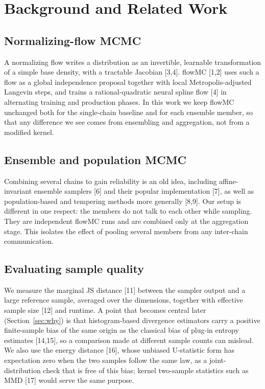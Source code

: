 \documentclass[11pt]{article}
\begin{document}
\section{Background and Related Work}

\subsection{Normalizing-flow MCMC}
A normalizing flow writes a distribution as an invertible, learnable
transformation of a simple base density, with a tractable Jacobian [3,4].
flowMC [1,2] uses such a flow as a global independence proposal together with
local Metropolis-adjusted Langevin steps, and trains a rational-quadratic
neural spline flow [4] in alternating training and production phases. In this
work we keep flowMC unchanged both for the single-chain baseline and for each
ensemble member, so that any difference we see comes from ensembling and
aggregation, not from a modified kernel.

\subsection{Ensemble and population MCMC}
Combining several chains to gain reliability is an old idea, including
affine-invariant ensemble samplers [6] and their popular implementation [7],
as well as population-based and tempering methods more generally [8,9]. Our
setup is different in one respect: the members do not talk to each other while
sampling. They are independent flowMC runs and are combined only at the
aggregation stage. This isolates the effect of pooling several members from
any inter-chain communication.

\subsection{Evaluating sample quality}
We measure the marginal JS distance [11] between the sampler output and a
large reference sample, averaged over the dimensions, together with effective
sample size [12] and runtime. A point that becomes central later
(Section~\ref{sec:why}) is that histogram-based divergence estimators carry a
positive finite-sample bias of the same origin as the classical bias of
plug-in entropy estimates [14,15], so a comparison made at different sample
counts can mislead. We also use the energy distance [16], whose unbiased
U-statistic form has expectation zero when the two samples follow the same
law, as a joint-distribution check that is free of this bias; kernel
two-sample statistics such as MMD [17] would serve the same purpose.
\end{document}
